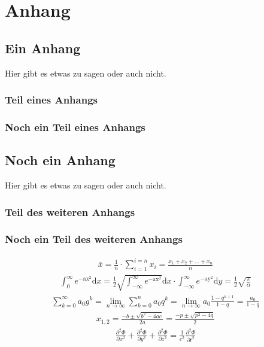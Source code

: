\appendix
\chapter{Anhang}
\section{Ein Anhang}
Hier gibt es etwas zu sagen oder auch nicht.
\subsection{Teil eines Anhangs}
\blindtext
\subsection{Noch ein Teil eines Anhangs}
\blinditemize
\section{Noch ein Anhang}
Hier gibt es etwas zu sagen oder auch nicht.
\subsection{Teil des weiteren Anhangs}
\blindenumerate
\subsection{Noch ein Teil des weiteren Anhangs}

\blindtext
\begin{align}
\bar x=\frac 1n\cdot\sum_{i=1}^{i=n}x_i=\frac{x_1+x_2+\ldots+x_n}{n}
\end{align}
\blindtext
\begin{align}
\int_0^\infty e^\mathrm{-ax^2}\mathrm dx=\frac 12\sqrt{\int_{-\infty}^\infty e^\mathrm{-ax^2}}\mathrm dx\cdot\int_{-\infty}^\infty e^\mathrm{-ay^2}\mathrm dy=\frac 12\sqrt{\frac{\pi}{\alpha}}
\end{align}
\blindtext
\begin{align}
\sum_{k=0}^\infty a_0g^k=\lim_{n\to\infty}\sum_{k=0}^na_0q^k=\lim_{n\to\infty}a_0\frac{1-q^{n+1}}{1-q}=\frac{a_0}{1-q}
\end{align}
\blindtext
\begin{align}
x_{1,2}=\frac{-b\pm\sqrt{b^2-4ac}}{2a}=\frac{-p\pm\sqrt{p^2-4q}}{2}
\end{align}
\blindtext
\begin{align}
\frac{\partial^2\Phi}{\partial x^2}+\frac{\partial^2\Phi}{\partial y^2}+\frac{\partial^2\Phi}{\partial z^2}=\frac{1}{c^2}\frac{\partial^2\Phi}{\partial t^2}
\end{align}
\blindtext